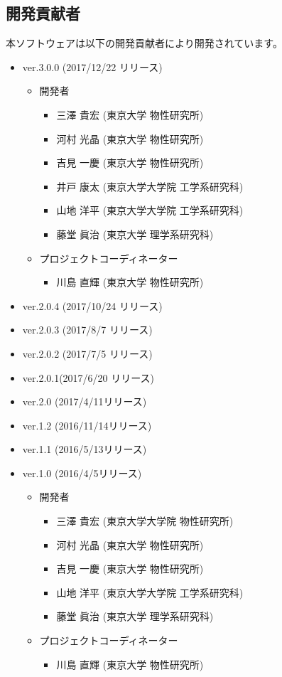 \subsection{開発貢献者}
\label{subsec:developers}
本ソフトウェアは以下の開発貢献者により開発されています。
\begin{itemize}
\item{ver.3.0.0 (2017/12/22 リリース)}
\begin{itemize}
\item{開発者}
	\begin{itemize}
	\item{三澤 貴宏 (東京大学 物性研究所)}
	\item{河村 光晶 (東京大学 物性研究所)}
	\item{吉見 一慶 (東京大学 物性研究所)}
	\item{井戸 康太 (東京大学大学院 工学系研究科)}
	\item{山地 洋平 (東京大学大学院 工学系研究科)}
	\item{藤堂 眞治 (東京大学 理学系研究科)}
	\end{itemize}
\item{プロジェクトコーディネーター}
	\begin{itemize}
	\item{川島 直輝 (東京大学 物性研究所)}
	\end{itemize}
\end{itemize}

\item{ver.2.0.4 (2017/10/24 リリース)}
\item{ver.2.0.3 (2017/8/7 リリース)}
\item{ver.2.0.2 (2017/7/5 リリース)}
\item{ver.2.0.1(2017/6/20 リリース)}
\item{ver.2.0 (2017/4/11リリース)}
\item{ver.1.2 (2016/11/14リリース)}
\item{ver.1.1 (2016/5/13リリース)}
\item{ver.1.0 (2016/4/5リリース)}
\begin{itemize}
\item{開発者}
	\begin{itemize}
	\item{三澤 貴宏 (東京大学大学院 物性研究所)}
	\item{河村 光晶 (東京大学 物性研究所)}
	\item{吉見 一慶 (東京大学 物性研究所)}
	\item{山地 洋平 (東京大学大学院 工学系研究科)}
	\item{藤堂 眞治 (東京大学 理学系研究科)}
	\end{itemize}
\item{プロジェクトコーディネーター}
	\begin{itemize}
	\item{川島 直輝 (東京大学 物性研究所)}
	\end{itemize}
\end{itemize}


\end{itemize}
